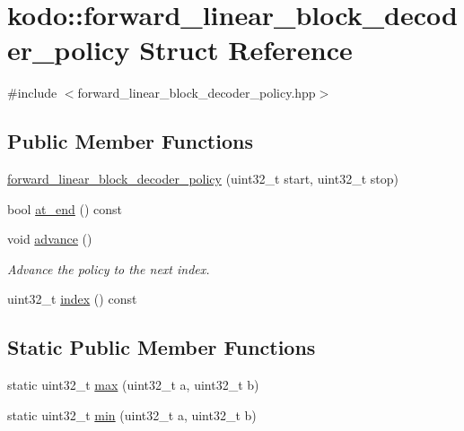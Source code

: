 \hypertarget{structkodo_1_1forward__linear__block__decoder__policy}{\section{kodo\-:\-:forward\-\_\-linear\-\_\-block\-\_\-decoder\-\_\-policy Struct Reference}
\label{structkodo_1_1forward__linear__block__decoder__policy}
}


{\ttfamily \#include $<$forward\-\_\-linear\-\_\-block\-\_\-decoder\-\_\-policy.\-hpp$>$}

\subsection*{Public Member Functions}
\begin{DoxyCompactItemize}
\item 
\hyperlink{structkodo_1_1forward__linear__block__decoder__policy_aaf635eb4373061a709548501c6c5f21d}{forward\-\_\-linear\-\_\-block\-\_\-decoder\-\_\-policy} (uint32\-\_\-t start, uint32\-\_\-t stop)
\item 
bool \hyperlink{structkodo_1_1forward__linear__block__decoder__policy_abf865f3ab10f74c86367a93cd9435fbf}{at\-\_\-end} () const 
\item 
\hypertarget{structkodo_1_1forward__linear__block__decoder__policy_ad8f035498bd061efc161bc201b1cd86e}{void \hyperlink{structkodo_1_1forward__linear__block__decoder__policy_ad8f035498bd061efc161bc201b1cd86e}{advance} ()}\label{structkodo_1_1forward__linear__block__decoder__policy_ad8f035498bd061efc161bc201b1cd86e}

\begin{DoxyCompactList}\small\item\em Advance the policy to the next index. \end{DoxyCompactList}\item 
uint32\-\_\-t \hyperlink{structkodo_1_1forward__linear__block__decoder__policy_aa8bf5982e6eded17de1dd7e149f3a382}{index} () const 
\end{DoxyCompactItemize}
\subsection*{Static Public Member Functions}
\begin{DoxyCompactItemize}
\item 
static uint32\-\_\-t \hyperlink{structkodo_1_1forward__linear__block__decoder__policy_a7137f9cc010242bde2842ccadfa2711f}{max} (uint32\-\_\-t a, uint32\-\_\-t b)
\item 
static uint32\-\_\-t \hyperlink{structkodo_1_1forward__linear__block__decoder__policy_a0f2a01fe3638d9f4ce00be60be72560e}{min} (uint32\-\_\-t a, uint32\-\_\-t b)
\end{DoxyCompactItemize}
